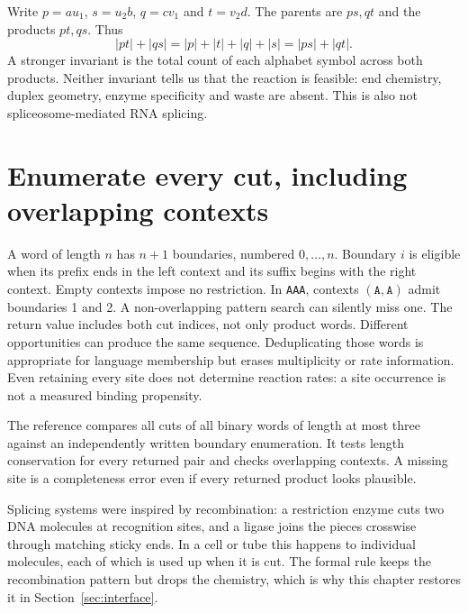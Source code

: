 
Write $p=au_1$, $s=u_2b$, $q=cv_1$ and $t=v_2d$. The parents are $ps,qt$
and the products $pt,qs$. Thus
\begin{equation}
 |pt|+|qs|=|p|+|t|+|q|+|s|=|ps|+|qt|.
 \label{eq:length}
\end{equation}
A stronger invariant is the total count of each alphabet symbol across
both products. Neither invariant tells us that the reaction is feasible:
end chemistry, duplex geometry, enzyme specificity and waste are absent.
This is also not spliceosome-mediated RNA splicing.

\section{Enumerate every cut, including overlapping contexts}
A word of length $n$ has $n+1$ boundaries, numbered $0,\ldots,n$.
Boundary $i$ is eligible when its prefix ends in the left context and its
suffix begins with the right context. Empty contexts impose no restriction.
In \texttt{AAA}, contexts $(\texttt{A},\texttt{A})$ admit boundaries 1 and 2.
A non-overlapping pattern search can silently miss one.
The return value includes both cut indices, not only product words.
Different opportunities can produce the same sequence. Deduplicating
those words is appropriate for language membership but erases multiplicity
or rate information. Even retaining every site does not determine reaction rates:
a site occurrence is not a measured binding propensity.

The reference compares all cuts of all binary words of length at most three
against an independently written boundary enumeration. It tests length
conservation for every returned pair and checks overlapping contexts.
A missing site is a completeness error even if every returned product looks plausible.

\begin{BioBridge}
Splicing systems were inspired by recombination: a restriction enzyme cuts two
DNA molecules at recognition sites, and a ligase joins the pieces crosswise
through matching sticky ends. In a cell or tube this happens to individual
molecules, each of which is used up when it is cut. The formal rule keeps the
recombination pattern but drops the chemistry, which is why this chapter
restores it in Section~\ref{sec:interface}.
\end{BioBridge}


